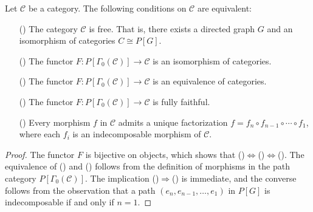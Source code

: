 \begin{proposition}
Let $\mathcal{C}$ be a category. The following conditions on $\mathcal{C}$ are equivalent:
\begin{itemize}
\item[(\rmnum{1})] The category $\mathcal{C}$ is free. That is, there exists a directed graph $G$ and an isomorphism of categories $C\cong P[G]$.
\item[(\rmnum{2})] The functor $F:P[\Gamma_0(\mathcal{C})]\to\mathcal{C}$ is an isomorphism of categories.
\item[(\rmnum{3})] The functor $F:P[\Gamma_0(\mathcal{C})]\to\mathcal{C}$ is an equivalence of categories.
\item[(\rmnum{4})] The functor $F:P[\Gamma_0(\mathcal{C})]\to\mathcal{C}$ is fully faithful.
\item[(\rmnum{5})] Every morphism $f$ in $\mathcal{C}$ admits a unique factorization $f=f_n\circ f_{n-1}\circ\cdots\circ f_1$, where each $f_i$ is an indecomposable morphism of $\mathcal{C}$.
\end{itemize}
\end{proposition}
\begin{proof}
The functor $F$ is bijective on objects, which shows that ()$\Leftrightarrow$()$\Leftrightarrow$(). The equivalence of () and () follows from the definition of morphisms in the path category $P[\Gamma_0(\mathcal{C})]$. The implication ()$\Rightarrow$() is immediate, and the converse follows from the observation that a path $(e_n,e_{n-1},\dots,e_1)$ in $P[G]$ is indecomposable if and only if $n=1$.
\end{proof}
